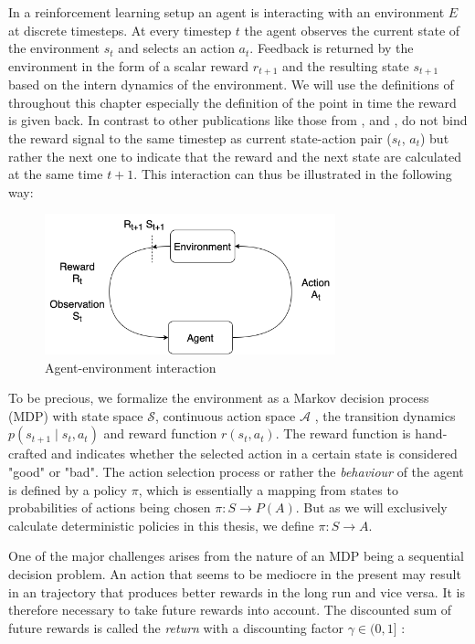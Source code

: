 In a reinforcement learning setup an agent is interacting with an environment $E$ at discrete timesteps. At every timestep $t$ the agent observes the current state of the environment $s_t$ and selects an action $a_t$. Feedback is returned by the environment in the form of a scalar reward $r_{t+1}$ and the resulting state $s_{t+1}$ based on the intern dynamics of the environment. We will use the definitions of \cite{Sutton1998} throughout this chapter especially the definition of the point in time the reward is given back. In contrast to other publications like those from \cite{zare2021continuous}, \cite{wiering2012reinforcement} and \cite{lillicrap2019continuous}, \cite{Sutton1998} do not bind the reward signal to the same timestep as current state-action pair ($s_t$, $a_t$) but rather the next one to indicate that the reward and the next state are calculated at the same time $t+1$.
This interaction can thus be illustrated in the following way:

\begin{figure}[H]
    \centering
    \includegraphics[width=0.75\textwidth]{images/agent_env_framework.png}
    \caption{Agent-environment interaction}
    \label{fig:lstm}
\end{figure}

To be precious, we formalize the environment as a Markov decision process (MDP) with state space $\mathcal{S}$, continuous action space $\mathcal{A}$ , the transition dynamics $p(s_{t+1} \mid s_t, a_t)$ and reward function $r(s_t, a_t)$. The reward function is hand-crafted and indicates whether the selected action in a certain state is considered "good" or "bad". The action selection process or rather the \textit{behaviour} of the agent is defined by a policy $\pi$, which is essentially a mapping from states to probabilities of actions being chosen $\pi: S \rightarrow P(A)$. But as we will exclusively calculate deterministic policies in this thesis, we define $\pi: S \rightarrow A$.
\par 
One of the major challenges arises from the nature of an MDP being a sequential decision problem. An action that seems to be mediocre in the present may result in an trajectory that produces better rewards in the long run and vice versa. It is therefore necessary to take future rewards into account. The discounted sum of future rewards is called the \textit{return} with a discounting factor $\gamma \in (0,1]$  \cite[p.55]{Sutton1998}:

